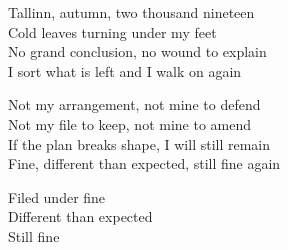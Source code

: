 \begin{lyrics}
Tallinn, autumn, two thousand nineteen\\
Cold leaves turning under my feet\\
No grand conclusion, no wound to explain\\
I sort what is left and I walk on again

Not my arrangement, not mine to defend\\
Not my file to keep, not mine to amend\\
If the plan breaks shape, I will still remain\\
Fine, different than expected, still fine again

Filed under fine\\
Different than expected\\
Still fine
\end{lyrics}

